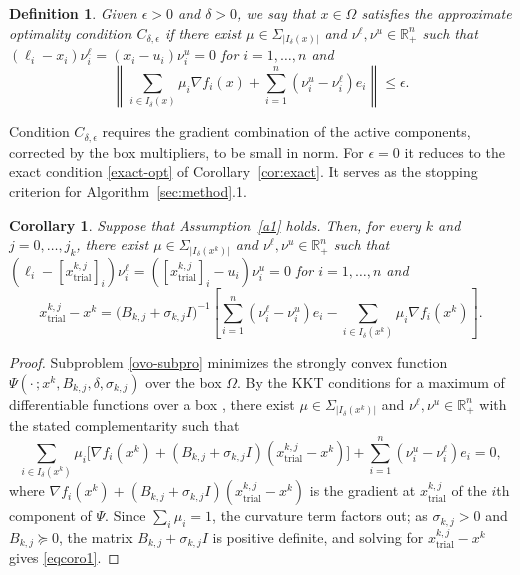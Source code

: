 \documentclass[11pt]{article}
\newcommand{\xkjtrial}{x^{k,j}_{\mathrm{trial}}}
\newtheorem{corollary}{Corollary}[section]
\newtheorem{definition}{Definition}[section]
\begin{document}
\begin{definition} \label{def:optcond}
Given $\epsilon > 0$ and $\delta > 0$, we say that $x \in \Omega$ satisfies the
\textit{approximate optimality condition} $C_{\delta,\epsilon}$ if there exist
$\mu \in \Sigma_{|I_\delta(x)|}$ and $\nu^\ell, \nu^u \in \mathbb{R}^n_+$ such
that $(\ell_i - x_i)\nu^\ell_i = (x_i - u_i)\nu^u_i = 0$ for $i = 1, \ldots, n$
and
\begin{equation} \label{miaprox-box}
\left\| \sum_{i \in I_\delta(x)} \mu_i \nabla f_i(x)
+ \sum_{i=1}^{n} (\nu^u_i - \nu^\ell_i) e_i \right\| \leq \epsilon.
\end{equation}
\end{definition}

Condition $C_{\delta,\epsilon}$ requires the gradient combination of the active
components, corrected by the box multipliers, to be small in norm. For
$\epsilon = 0$ it reduces to the exact condition \eqref{exact-opt} of
Corollary~\ref{cor:exact}. It serves as the stopping criterion for
Algorithm~\ref{sec:method}.1.

\begin{corollary} \label{cor:step}
Suppose that Assumption~\ref{a1} holds. Then, for every $k$ and
$j = 0, \ldots, j_k$, there exist $\mu \in \Sigma_{|I_\delta(x^k)|}$ and
$\nu^\ell, \nu^u \in \mathbb{R}^n_+$ such that
$(\ell_i - [\xkjtrial]_i)\nu^\ell_i = ([\xkjtrial]_i - u_i)\nu^u_i = 0$ for
$i = 1, \ldots, n$ and
\begin{equation} \label{eqcoro1}
\xkjtrial - x^k = \big( B_{k,j} + \sigma_{k,j} I \big)^{-1}
\left[ \sum_{i=1}^{n} (\nu^\ell_i - \nu^u_i) e_i
- \sum_{i \in I_\delta(x^k)} \mu_i \nabla f_i(x^k) \right].
\end{equation}
\end{corollary}

\begin{proof}
Subproblem \eqref{ovo-subpro} minimizes the strongly convex function
$\Psi(\cdot\,; x^k, B_{k,j}, \delta, \sigma_{k,j})$ over the box $\Omega$. By
the KKT conditions for a maximum of differentiable functions over a box
\cite[Lemma~3.1]{alvarezovo}, there exist $\mu \in \Sigma_{|I_\delta(x^k)|}$ and
$\nu^\ell, \nu^u \in \mathbb{R}^n_+$ with the stated complementarity such that
\[
\sum_{i \in I_\delta(x^k)} \mu_i
\big[ \nabla f_i(x^k) + (B_{k,j} + \sigma_{k,j} I)(\xkjtrial - x^k) \big]
+ \sum_{i=1}^n (\nu^u_i - \nu^\ell_i) e_i = 0,
\]
where $\nabla f_i(x^k) + (B_{k,j} + \sigma_{k,j} I)(\xkjtrial - x^k)$ is the
gradient at $\xkjtrial$ of the $i$th component of $\Psi$. Since
$\sum_i \mu_i = 1$, the curvature term factors out; as $\sigma_{k,j} > 0$ and
$B_{k,j} \succeq 0$, the matrix $B_{k,j} + \sigma_{k,j} I$ is positive definite,
and solving for $\xkjtrial - x^k$ gives \eqref{eqcoro1}.
\end{proof}
\end{document}

